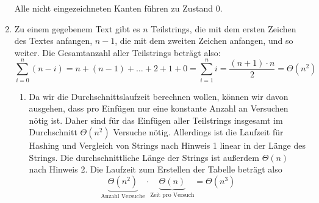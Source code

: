 \documentclass[11pt,a4paper]{article}
\begin{document}
\begin{loesung}
\begin{enumerate}
\begin{figure}[h!]
        \end{figure}
        \FloatBarrier
        Alle nicht eingezeichneten Kanten führen zu Zustand 0.

        \item
        Zu einem gegebenem Text gibt es $n$ Teilstrings, die mit dem ersten Zeichen des Textes anfangen, $n - 1$, die mit dem zweiten Zeichen anfangen, und so weiter.
        Die Gesamtanzahl aller Teilstrings beträgt also:
        \begin{equation*}
            \sum\limits_{i = 0}^n (n - i) = n + (n - 1) + \ldots + 2 + 1 + 0 = \sum\limits_{i = 1}^n i = \frac{(n + 1) \cdot n}{2} = \Theta(n^2)
        \end{equation*}

        \begin{enumerate}[label=\roman*)]
            \item Da wir die Durchschnittslaufzeit berechnen wollen, können wir davon ausgehen, dass pro Einfügen nur eine konstante Anzahl an Versuchen nötig ist.
            Daher sind für das Einfügen aller Teilstrings insgesamt im Durchschnitt $\Theta(n^2)$ Versuche nötig.
            Allerdings ist die Laufzeit für Hashing und Vergleich von Strings nach Hinweis 1 linear in der Länge des Strings.
            Die durchschnittliche Länge der Strings ist außerdem $\Theta(n)$ nach Hinweis 2.
            Die Laufzeit zum Erstellen der Tabelle beträgt also 
            \begin{equation*}
                \underbrace{\Theta(n^2)}_{\text{Anzahl Versuche}} \cdot \underbrace{\Theta(n)}_{\text{Zeit pro Versuch}} = \Theta(n^3)
            \end{equation*}


\end{enumerate}
\end{enumerate}
\end{loesung}
\end{document}
